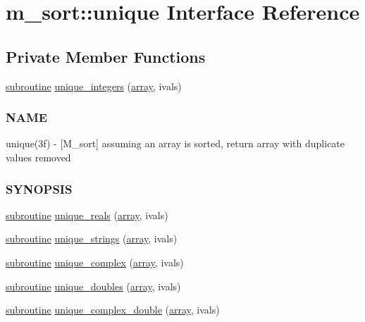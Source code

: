 \hypertarget{interfacem__sort_1_1unique}{}\section{m\+\_\+sort\+:\+:unique Interface Reference}
\label{interfacem__sort_1_1unique}
\subsection*{Private Member Functions}
\begin{DoxyCompactItemize}
\item 
\hyperlink{M__stopwatch_83_8txt_acfbcff50169d691ff02d4a123ed70482}{subroutine} \hyperlink{interfacem__sort_1_1unique_a3e0d108450dfad8debcc3a8ab9e75c6d}{unique\+\_\+integers} (\hyperlink{intro__blas1_83_8txt_a89db1945e1a335ab0184c6a097821e32}{array}, ivals)
\begin{DoxyCompactList}\small\item\em \subsubsection*{N\+A\+ME}

unique(3f) -\/ \mbox{[}M\+\_\+sort\mbox{]} assuming an array is sorted, return array with duplicate values removed \subsubsection*{S\+Y\+N\+O\+P\+S\+IS}\end{DoxyCompactList}\item 
\hyperlink{M__stopwatch_83_8txt_acfbcff50169d691ff02d4a123ed70482}{subroutine} \hyperlink{interfacem__sort_1_1unique_a59f7d209491f9b26f8cfb2ff55a93511}{unique\+\_\+reals} (\hyperlink{intro__blas1_83_8txt_a89db1945e1a335ab0184c6a097821e32}{array}, ivals)
\item 
\hyperlink{M__stopwatch_83_8txt_acfbcff50169d691ff02d4a123ed70482}{subroutine} \hyperlink{interfacem__sort_1_1unique_a9efcc29118dee81c51f93c60d6089e6f}{unique\+\_\+strings} (\hyperlink{intro__blas1_83_8txt_a89db1945e1a335ab0184c6a097821e32}{array}, ivals)
\item 
\hyperlink{M__stopwatch_83_8txt_acfbcff50169d691ff02d4a123ed70482}{subroutine} \hyperlink{interfacem__sort_1_1unique_a2c70be0dbee027039dc164c8500963a0}{unique\+\_\+complex} (\hyperlink{intro__blas1_83_8txt_a89db1945e1a335ab0184c6a097821e32}{array}, ivals)
\item 
\hyperlink{M__stopwatch_83_8txt_acfbcff50169d691ff02d4a123ed70482}{subroutine} \hyperlink{interfacem__sort_1_1unique_a054c4941cf5925504732c715e5548f5b}{unique\+\_\+doubles} (\hyperlink{intro__blas1_83_8txt_a89db1945e1a335ab0184c6a097821e32}{array}, ivals)
\item 
\hyperlink{M__stopwatch_83_8txt_acfbcff50169d691ff02d4a123ed70482}{subroutine} \hyperlink{interfacem__sort_1_1unique_a049259cd14295e1b5005151504cb1d82}{unique\+\_\+complex\+\_\+double} (\hyperlink{intro__blas1_83_8txt_a89db1945e1a335ab0184c6a097821e32}{array}, ivals)
\end{DoxyCompactItemize}


